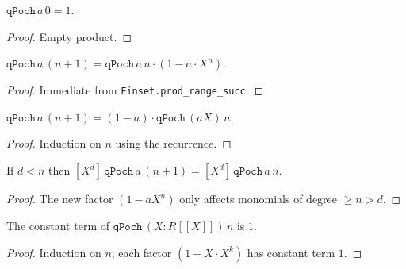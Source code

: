 \begin{lemma}\label{lem:fps-qPoch-zero}\leanok{}
$\texttt{qPoch}\,a\,0 = 1$.
\end{lemma}

\begin{proof}\leanok Empty product. \end{proof}

\begin{lemma}\label{lem:fps-qPoch-succ}\leanok{}
$\texttt{qPoch}\,a\,(n+1) = \texttt{qPoch}\,a\,n \cdot (1 - a\cdot X^n)$.
\end{lemma}

\begin{proof}\leanok Immediate from \texttt{Finset.prod\_range\_succ}. \end{proof}

\begin{lemma}\label{lem:fps-qPoch-shift}\leanok{}
$\texttt{qPoch}\,a\,(n+1) = (1-a)\cdot\texttt{qPoch}\,(aX)\,n$.
\end{lemma}

\begin{proof}\leanok Induction on $n$ using the recurrence. \end{proof}

\begin{lemma}\label{lem:fps-coeff-stable}\leanok{}
If $d < n$ then $[X^d]\,\texttt{qPoch}\,a\,(n+1) = [X^d]\,\texttt{qPoch}\,a\,n$.
\end{lemma}

\begin{proof}\leanok
The new factor $(1 - a X^n)$ only affects monomials of degree $\ge n > d$.
\end{proof}

\begin{lemma}\label{lem:fps-constantCoeff-qPoch-X}\leanok{}
The constant term of $\texttt{qPoch}\,(X : R[\![ X]\!])\,n$ is $1$.
\end{lemma}

\begin{proof}\leanok Induction on $n$; each factor $(1 - X \cdot X^k)$ has constant term $1$. \end{proof}

